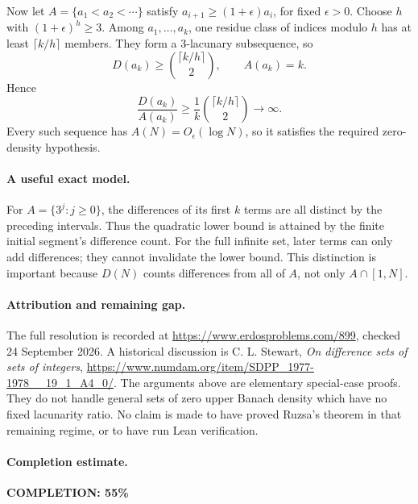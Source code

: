 Now let \(A=\{a_1<a_2<\cdots\}\) satisfy
\(a_{i+1}\geq(1+\epsilon)a_i\), for fixed \(\epsilon>0\).
Choose \(h\) with \((1+\epsilon)^h\geq3\).
Among \(a_1,\ldots,a_k\), one residue class of indices
modulo \(h\) has at least \(\lceil k/h\rceil\) members.
They form a 3-lacunary subsequence, so
\[
 D(a_k)\geq\binom{\lceil k/h\rceil}{2},
 \qquad A(a_k)=k.
\]
Hence
\[
 \frac{D(a_k)}{A(a_k)}
 \geq\frac1k\binom{\lceil k/h\rceil}{2}
 \longrightarrow\infty.
\]
Every such sequence has \(A(N)=O_\epsilon(\log N)\),
so it satisfies the required zero-density hypothesis.

\paragraph{A useful exact model.}
For \(A=\{3^j:j\geq0\}\), the differences of its first
\(k\) terms are all distinct by the preceding intervals.
Thus the quadratic lower bound is attained by the
finite initial segment's difference count.
For the full infinite set, later terms can only add
differences; they cannot invalidate the lower bound.
This distinction is important because \(D(N)\) counts
differences from all of \(A\), not only \(A\cap[1,N]\).

\paragraph{Attribution and remaining gap.}
The full resolution is recorded at
\url{https://www.erdosproblems.com/899}, checked
24 September 2026. A historical discussion is
C. L. Stewart, \emph{On difference sets of sets of integers},
\url{https://www.numdam.org/item/SDPP_1977-1978__19_1_A4_0/}.
The arguments above are elementary special-case proofs.
They do not handle general sets of zero upper Banach
density which have no fixed lacunarity ratio.
No claim is made to have proved Ruzsa's theorem in that
remaining regime, or to have run Lean verification.

\paragraph{Completion estimate.}
\textbf{COMPLETION: 55\%}

